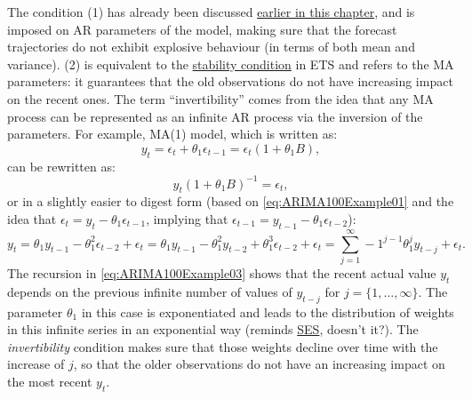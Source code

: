 \documentclass[
]{book}
\theoremstyle{definition}
\theoremstyle{definition}
\theoremstyle{definition}
\theoremstyle{definition}
\theoremstyle{remark}
\begin{document}
The condition (1) has already been discussed \protect\hyperlink{ARIMAIntro}{earlier in this chapter}, and is imposed on AR parameters of the model, making sure that the forecast trajectories do not exhibit explosive behaviour (in terms of both mean and variance). (2) is equivalent to the \protect\hyperlink{stabilityConditionAdditiveError}{stability condition} in ETS and refers to the MA parameters: it guarantees that the old observations do not have increasing impact on the recent ones. The term ``invertibility'' comes from the idea that any MA process can be represented as an infinite AR process via the inversion of the parameters. For example, MA(1) model, which is written as:
\begin{equation}
  y_t = \epsilon_t + \theta_1 \epsilon_{t-1} = \epsilon_t (1 + \theta_1 B) ,
  \label{eq:ARIMA100Example01}
\end{equation}
can be rewritten as:
\begin{equation}
  y_t (1 + \theta_1 B)^{-1} = \epsilon_t,
  \label{eq:ARIMA100Example02}
\end{equation}
or in a slightly easier to digest form (based on \eqref{eq:ARIMA100Example01} and the idea that \(\epsilon_{t} = y_{t} - \theta_1 \epsilon_{t-1}\), implying that \(\epsilon_{t-1} = y_{t-1} - \theta_1 \epsilon_{t-2}\)):
\begin{equation}
  y_t = \theta_1 y_{t-1} - \theta_1^2 \epsilon_{t-2} + \epsilon_t = \theta_1 y_{t-1} - \theta_1^2 y_{t-2} + \theta_1^3 \epsilon_{t-2} + \epsilon_t = \sum_{j=1}^\infty -1^{j-1} \theta_1^j y_{t-j} + \epsilon_t.
  \label{eq:ARIMA100Example03}
\end{equation}
The recursion in \eqref{eq:ARIMA100Example03} shows that the recent actual value \(y_t\) depends on the previous infinite number of values of \(y_{t-j}\) for \(j=\{1,\dots,\infty\}\). The parameter \(\theta_1\) in this case is exponentiated and leads to the distribution of weights in this infinite series in an exponential way (reminds \protect\hyperlink{SES}{SES}, doesn't it?). The \emph{invertibility} condition makes sure that those weights decline over time with the increase of \(j\), so that the older observations do not have an increasing impact on the most recent \(y_t\).
\end{document}
